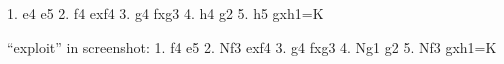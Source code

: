 

1. e4 e5 2. f4 exf4 3. g4 fxg3 4. h4 g2
5. h5 gxh1=K

``exploit'' in screenshot:
1. f4 e5 2. Nf3 exf4 3. g4 fxg3 4. Ng1 g2 5. Nf3 gxh1=K








